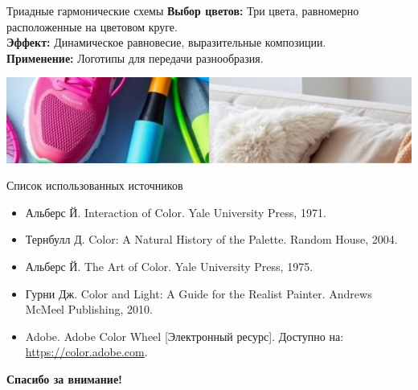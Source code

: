 \documentclass{beamer}
\begin{document}
\begin{frame}{Триадные гармонические схемы}
    \textbf{Выбор цветов:} Три цвета, равномерно расположенные на цветовом круге. \\
    \vspace{0.3cm}
    \textbf{Эффект:} Динамическое равновесие, выразительные композиции. \\
    \vspace{0.3cm}
    \textbf{Применение:} Логотипы для передачи разнообразия.
    \begin{center}
        \includegraphics[width=0.6\linewidth]{triadic_example.png} %
    \end{center}
\end{frame}

\begin{frame}{Список использованных источников}
    \begin{itemize}
        \item Альберс Й. Interaction of Color. Yale University Press, 1971.
        \item Тернбулл Д. Color: A Natural History of the Palette. Random House, 2004.
        \item Альберс Й. The Art of Color. Yale University Press, 1975.
        \item Гурни Дж. Color and Light: A Guide for the Realist Painter. Andrews McMeel Publishing, 2010.
        \item Adobe. Adobe Color Wheel [Электронный ресурс]. Доступно на: \url{https://color.adobe.com}.
    \end{itemize}
\end{frame}

\begin{frame}
    \centering
    \textbf{\huge Спасибо за внимание!}
\end{frame}
\end{document}
